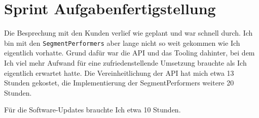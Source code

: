 \documentclass[a4paper,10pt]{scrartcl}
\begin{document}
\section{Sprint Aufgabenfertigstellung}

  Die Besprechung mit den Kunden verlief wie geplant und war schnell durch.
  Ich bin mit den \lstinline{SegmentPerformers} aber lange nicht so weit gekommen
  wie Ich eigentlich vorhatte.
  Grund dafür war die API und das Tooling dahinter, bei dem Ich viel mehr Aufwand
  für eine zufriedenstellende Umsetzung brauchte als Ich eigentlich erwartet
  hatte.
  Die Vereinheitlichung der API hat mich etwa 13 Stunden gekostet, die
  Implementierung der SegmentPerformers weitere 20 Stunden.

  Für die Software-Updates brauchte Ich etwa 10 Stunden.
\end{document}
